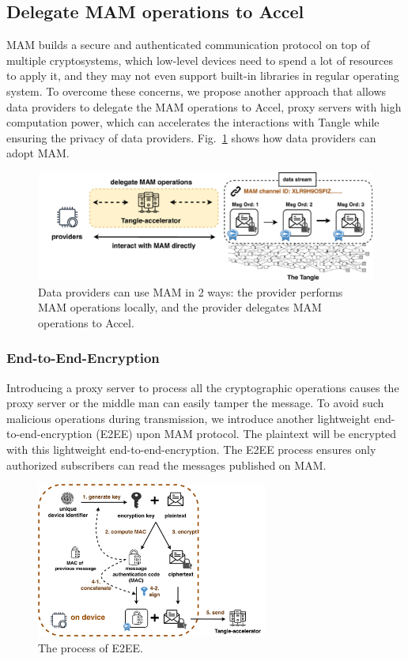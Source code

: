 \documentclass[conference]{IEEEtran}
\begin{document}
\subsection{Delegate MAM operations to Accel}
\label{section:ta_endpoint}
MAM builds a secure and authenticated communication protocol on top of multiple cryptosystems, which low-level devices need to spend a lot of resources to apply it, and they may not even support built-in libraries in regular operating system. To overcome these concerns, we propose another approach that allows data providers to delegate the MAM operations to Accel, proxy servers with high computation power, which can accelerates the interactions with Tangle while ensuring the privacy of data providers. Fig.~\ref{fig:delegation} shows how data providers can adopt MAM.

\begin{figure}[!t]
    \centering
    \includegraphics[width=\linewidth]{delegation}
    \caption{Data providers can use MAM in 2 ways: the provider performs MAM operations locally, and the provider delegates MAM operations to Accel.}
    \label{fig:delegation}
\end{figure}

\subsubsection{End-to-End-Encryption}
Introducing a proxy server to process all the cryptographic operations causes the proxy server or the middle man can easily tamper the message. To avoid such malicious operations during transmission, we introduce another lightweight end-to-end-encryption (E2EE) upon MAM protocol. The plaintext will be encrypted with this lightweight end-to-end-encryption. The E2EE process ensures only authorized subscribers can read the messages published on MAM.

\begin{figure}[!h]
    \centering
    \includegraphics[width=3in]{MAM_E2EE_fold}
    \caption{The process of E2EE.}
    \label{fig:MAM_E2EE}
\end{figure}
\end{document}
